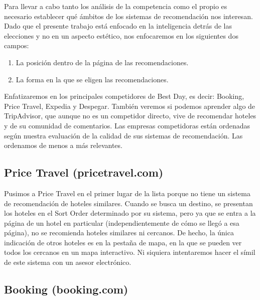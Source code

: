 \documentclass[12pt]{report}
\begin{document}
Para llevar a cabo tanto los análisis de la competencia como el propio es necesario establecer qué ámbitos de los sistemas de recomendación nos interesan. Dado que el presente trabajo está enfocado en la inteligencia detrás de las elecciones y no en un aspecto estético, nos enfocaremos en los siguientes dos campos:
\begin{enumerate}
	\item La posición dentro de la página de las recomendaciones.
	\item La forma en la que se eligen las recomendaciones.
\end{enumerate}
Enfatizaremos en los principales competidores de Best Day, es decir: Booking, Price Travel, Expedia y Despegar. También veremos si podemos aprender algo de TripAdvisor, que aunque no es un competidor directo, vive de recomendar hoteles y de su comunidad de comentarios. Las empresas competidoras están ordenadas según nuestra evaluación de la calidad de sus sistemas de recomendación. Las ordenamos de menos a más relevantes.

\subsection*{Price Travel (pricetravel.com)}

Pusimos a Price Travel en el primer lugar de la lista porque no tiene un sistema de recomendación de hoteles similares. Cuando se busca un destino, se presentan los hoteles en el Sort Order determinado por su sistema, pero ya que se entra a la página de un hotel en particular (independientemente de cómo se llegó a esa página), no se recomienda hoteles similares ni cercanos. De hecho, la única indicación de otros hoteles es en la pestaña de mapa, en la que se pueden ver todos los cercanos en un mapa interactivo. Ni siquiera intentaremos hacer el símil de este sistema con un asesor electrónico.

\subsection*{Booking (booking.com)}
\end{document}
